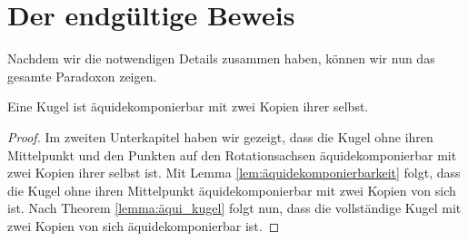\section{Der endgültige Beweis}

Nachdem wir die notwendigen Details zusammen haben, können wir nun das gesamte Paradoxon zeigen.
\begin{theorem}\label{thm:BanachTarski}
Eine Kugel ist äquidekomponierbar mit zwei Kopien ihrer selbst.
\end{theorem}
\begin{proof} 
Im zweiten Unterkapitel haben wir gezeigt, dass die Kugel ohne ihren Mittelpunkt und den Punkten auf den Rotationsachsen äquidekomponierbar
mit zwei Kopien ihrer selbst ist. Mit Lemma \ref{lem:äquidekomponierbarkeit} folgt, dass die Kugel ohne ihren Mittelpunkt äquidekomponierbar
mit zwei Kopien von sich ist. Nach Theorem \ref{lemma:äqui_kugel} folgt nun, dass die vollständige Kugel mit zwei Kopien von sich äquidekomponierbar
ist.
\end{proof}